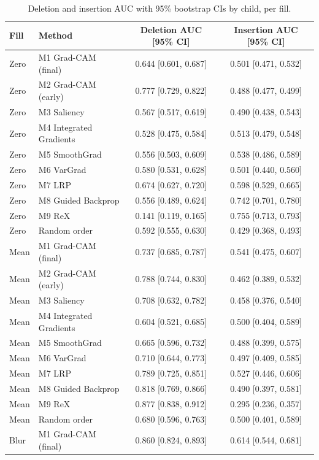 \documentclass[11pt]{article}
\begin{document}
\begin{table}[H]
\centering
\caption{Deletion and insertion AUC with 95\% bootstrap CIs by child, per fill.}
\label{tab:fillsci}
\small
\begin{tabular}{llcc}
\toprule
Fill & Method & Deletion AUC [95\% CI] & Insertion AUC [95\% CI] \\
\midrule
Zero & M1 Grad-CAM (final) & 0.644 [0.601, 0.687] & 0.501 [0.471, 0.532] \\
Zero & M2 Grad-CAM (early) & 0.777 [0.729, 0.822] & 0.488 [0.477, 0.499] \\
Zero & M3 Saliency & 0.567 [0.517, 0.619] & 0.490 [0.438, 0.543] \\
Zero & M4 Integrated Gradients & 0.528 [0.475, 0.584] & 0.513 [0.479, 0.548] \\
Zero & M5 SmoothGrad & 0.556 [0.503, 0.609] & 0.538 [0.486, 0.589] \\
Zero & M6 VarGrad & 0.580 [0.531, 0.628] & 0.501 [0.440, 0.560] \\
Zero & M7 LRP & 0.674 [0.627, 0.720] & 0.598 [0.529, 0.665] \\
Zero & M8 Guided Backprop & 0.556 [0.489, 0.624] & 0.742 [0.701, 0.780] \\
Zero & M9 ReX & 0.141 [0.119, 0.165] & 0.755 [0.713, 0.793] \\
Zero & Random order & 0.592 [0.555, 0.630] & 0.429 [0.368, 0.493] \\
\midrule
Mean & M1 Grad-CAM (final) & 0.737 [0.685, 0.787] & 0.541 [0.475, 0.607] \\
Mean & M2 Grad-CAM (early) & 0.788 [0.744, 0.830] & 0.462 [0.389, 0.532] \\
Mean & M3 Saliency & 0.708 [0.632, 0.782] & 0.458 [0.376, 0.540] \\
Mean & M4 Integrated Gradients & 0.604 [0.521, 0.685] & 0.500 [0.404, 0.589] \\
Mean & M5 SmoothGrad & 0.665 [0.596, 0.732] & 0.488 [0.399, 0.575] \\
Mean & M6 VarGrad & 0.710 [0.644, 0.773] & 0.497 [0.409, 0.585] \\
Mean & M7 LRP & 0.789 [0.725, 0.851] & 0.527 [0.446, 0.606] \\
Mean & M8 Guided Backprop & 0.818 [0.769, 0.866] & 0.490 [0.397, 0.581] \\
Mean & M9 ReX & 0.877 [0.838, 0.912] & 0.295 [0.236, 0.357] \\
Mean & Random order & 0.680 [0.596, 0.763] & 0.500 [0.401, 0.589] \\
\midrule
Blur & M1 Grad-CAM (final) & 0.860 [0.824, 0.893] & 0.614 [0.544, 0.681] \\

\end{tabular}
\end{table}
\end{document}
